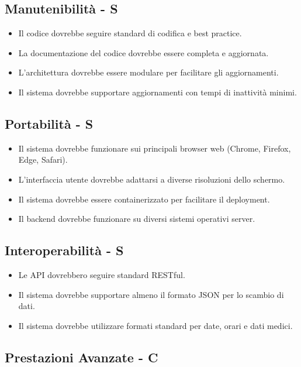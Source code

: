 \documentclass[12pt,a4paper,oneside]{report}
\begin{document}
\subsection{Manutenibilità - S}

\begin{itemize}
    \item Il codice dovrebbe seguire standard di codifica e best practice.
    \item La documentazione del codice dovrebbe essere completa e aggiornata.
    \item L'architettura dovrebbe essere modulare per facilitare gli aggiornamenti.
    \item Il sistema dovrebbe supportare aggiornamenti con tempi di inattività minimi.
\end{itemize}

\subsection{Portabilità - S}

\begin{itemize}
    \item Il sistema dovrebbe funzionare sui principali browser web (Chrome, Firefox, Edge, Safari).
    \item L'interfaccia utente dovrebbe adattarsi a diverse risoluzioni dello schermo.
    \item Il sistema dovrebbe essere containerizzato per facilitare il deployment.
    \item Il backend dovrebbe funzionare su diversi sistemi operativi server.
\end{itemize}

\subsection{Interoperabilità - S}

\begin{itemize}
    \item Le API dovrebbero seguire standard RESTful.
    \item Il sistema dovrebbe supportare almeno il formato JSON per lo scambio di dati.
    \item Il sistema dovrebbe utilizzare formati standard per date, orari e dati medici.
\end{itemize}

\subsection{Prestazioni Avanzate - C}
\end{document}
